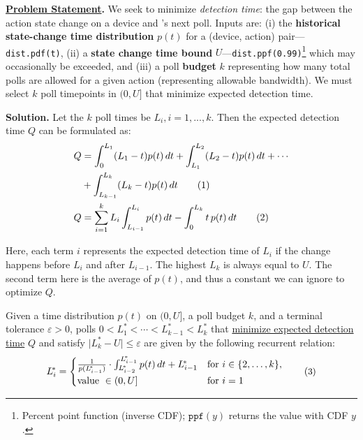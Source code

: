 \noindent \textbf{\underline{Problem Statement}.}
We seek to minimize \emph{detection time}: the gap between the action state change on a device and \sysname's next poll.
Inputs are: (i) the {\bf historical state-change time distribution} \(p(t)\) for a (device, action) pair---\texttt{dist.pdf(t)}, (ii) a {\bf state change time bound} $U$---\texttt{dist.ppf(0.99)}\footnote{Percent point function (inverse CDF); \(\texttt{ppf}(y)\) returns the value with CDF \(y\).} which may occasionally be exceeded, and (iii) a poll \textbf{budget} \(k\) representing how many total polls are allowed for a given action (representing allowable bandwidth).
We must 
select \(k\) poll timepoints in \((0,U]\) that minimize expected detection time.

\noindent \textbf{Solution.}
Let the $k$ poll times be $L_i, i=1,...,k$. Then the expected detection time $Q$ can be formulated as:
{\small
\begin{align}
Q &= \int_{0}^{L_1} (L_1-t)p(t)\,dt 
   + \int_{L_1}^{L_2} (L_2-t)p(t)\,dt + \cdots \notag \\ 
  &+ \int_{L_{k-1}}^{L_k} (L_k-t)p(t)\,dt \tag{1} \\
Q &= \sum_{i=1}^{k} L_i \int_{L_{i-1}}^{L_i} p(t)\, dt
   - \int_{0}^{L_k} t\,p(t)\, dt \tag{2} \label{rasc:eq:Q}
\end{align}
}

Here, each term $i$ represents the expected detection time of $L_i$ if the change happens before $L_i$ and after $L_{i-1}$. The highest ${L_k}$ is always equal to $U$.
The second term here is the average of $p(t)$, and thus a constant we can ignore to optimize $Q$.

\begin{theorem}
Given a time distribution $p(t)$ on $(0,U]$, a poll budget $k$, and a terminal tolerance $\varepsilon>0$,
polls
$0<{L_1^{\!*}}<\cdots<L_{k-1}^{\!*}<L_k^{\!*}$
that \underline{minimize 
expected detection time} $Q$ and satisfy $\lvert L_k^{\!*}-U\rvert\le\varepsilon$ are given by the following recurrent relation:
{%
\[
L_i^{\!*} =
\begin{cases} 
\frac{1}{p(L_{i-1}^{\!*})} \cdot \int_{L_{i-2}^{\!*}}^{L_{i-1}^{\!*}} p(t)\, dt + L_{i-1}^{\!*} & \text{for } i \in \{2,\dots,k\}, \\
\text{value } \in (0,U] & \text{for } i=1
\end{cases} {\tag{\small 3}} \label{rasc:eq:recurrence}
\]
}
\end{theorem}

